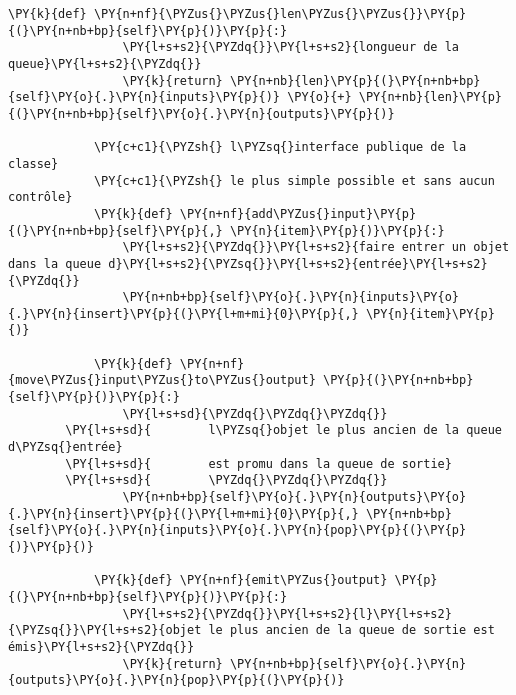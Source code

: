 \begin{Verbatim}[commandchars=\\\{\},frame=single,framerule=0.3mm,rulecolor=\color{cellframecolor}]
            \PY{k}{def} \PY{n+nf}{\PYZus{}\PYZus{}len\PYZus{}\PYZus{}}\PY{p}{(}\PY{n+nb+bp}{self}\PY{p}{)}\PY{p}{:}
                \PY{l+s+s2}{\PYZdq{}}\PY{l+s+s2}{longueur de la queue}\PY{l+s+s2}{\PYZdq{}}
                \PY{k}{return} \PY{n+nb}{len}\PY{p}{(}\PY{n+nb+bp}{self}\PY{o}{.}\PY{n}{inputs}\PY{p}{)} \PY{o}{+} \PY{n+nb}{len}\PY{p}{(}\PY{n+nb+bp}{self}\PY{o}{.}\PY{n}{outputs}\PY{p}{)}        
        
            \PY{c+c1}{\PYZsh{} l\PYZsq{}interface publique de la classe}
            \PY{c+c1}{\PYZsh{} le plus simple possible et sans aucun contrôle}
            \PY{k}{def} \PY{n+nf}{add\PYZus{}input}\PY{p}{(}\PY{n+nb+bp}{self}\PY{p}{,} \PY{n}{item}\PY{p}{)}\PY{p}{:}
                \PY{l+s+s2}{\PYZdq{}}\PY{l+s+s2}{faire entrer un objet dans la queue d}\PY{l+s+s2}{\PYZsq{}}\PY{l+s+s2}{entrée}\PY{l+s+s2}{\PYZdq{}}
                \PY{n+nb+bp}{self}\PY{o}{.}\PY{n}{inputs}\PY{o}{.}\PY{n}{insert}\PY{p}{(}\PY{l+m+mi}{0}\PY{p}{,} \PY{n}{item}\PY{p}{)}
                
            \PY{k}{def} \PY{n+nf}{move\PYZus{}input\PYZus{}to\PYZus{}output} \PY{p}{(}\PY{n+nb+bp}{self}\PY{p}{)}\PY{p}{:}
                \PY{l+s+sd}{\PYZdq{}\PYZdq{}\PYZdq{}}
        \PY{l+s+sd}{        l\PYZsq{}objet le plus ancien de la queue d\PYZsq{}entrée}
        \PY{l+s+sd}{        est promu dans la queue de sortie}
        \PY{l+s+sd}{        \PYZdq{}\PYZdq{}\PYZdq{}}
                \PY{n+nb+bp}{self}\PY{o}{.}\PY{n}{outputs}\PY{o}{.}\PY{n}{insert}\PY{p}{(}\PY{l+m+mi}{0}\PY{p}{,} \PY{n+nb+bp}{self}\PY{o}{.}\PY{n}{inputs}\PY{o}{.}\PY{n}{pop}\PY{p}{(}\PY{p}{)}\PY{p}{)}
                
            \PY{k}{def} \PY{n+nf}{emit\PYZus{}output} \PY{p}{(}\PY{n+nb+bp}{self}\PY{p}{)}\PY{p}{:}
                \PY{l+s+s2}{\PYZdq{}}\PY{l+s+s2}{l}\PY{l+s+s2}{\PYZsq{}}\PY{l+s+s2}{objet le plus ancien de la queue de sortie est émis}\PY{l+s+s2}{\PYZdq{}}
                \PY{k}{return} \PY{n+nb+bp}{self}\PY{o}{.}\PY{n}{outputs}\PY{o}{.}\PY{n}{pop}\PY{p}{(}\PY{p}{)}
\end{Verbatim}


